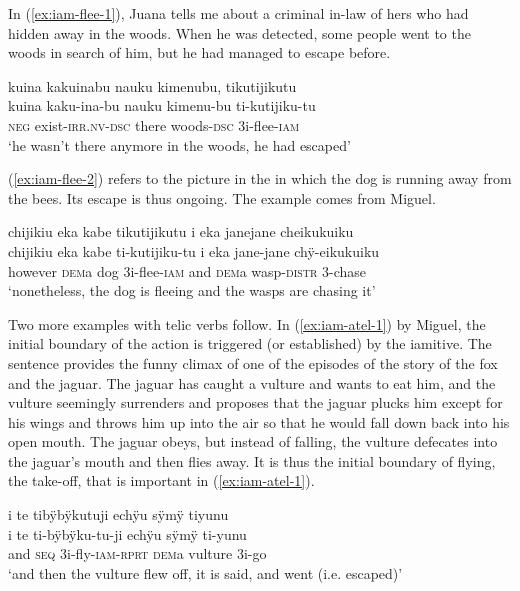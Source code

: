 In (\ref{ex:iam-flee-1}), Juana tells me about a criminal in-law of hers who had hidden away in the woods. When he was detected, some people went to the woods in search of him, but he had managed to escape before.

\ea\label{ex:iam-flee-1}
\begingl
\glpreamble kuina kakuinabu nauku kimenubu, tikutijikutu\\
\gla kuina kaku-ina-bu nauku kimenu-bu ti-kutijiku-tu\\
\glb \textsc{neg} exist-\textsc{irr.nv}-\textsc{dsc} there woods-\textsc{dsc} 3i-flee-\textsc{iam}\\
\glft ‘he wasn’t there anymore in the woods, he had escaped’
\endgl
\trailingcitation{[jxx-p120430l-2.053]}
\xe

(\ref{ex:iam-flee-2}) refers to the picture in the  in which the dog is running away from the bees. Its escape is thus ongoing. The example comes from Miguel.

\ea\label{ex:iam-flee-2}
\begingl
\glpreamble chijikiu eka kabe tikutijikutu i eka janejane cheikukuiku\\
\gla chijikiu eka kabe ti-kutijiku-tu i eka jane-jane chÿ-eikukuiku\\
\glb however \textsc{dem}a dog 3i-flee-\textsc{iam} and \textsc{dem}a wasp-\textsc{distr} 3-chase\\
\glft ‘nonetheless, the dog is fleeing and the wasps are chasing it’
\endgl
\trailingcitation{[mox-a110920l-2.104]}
\xe

Two more examples with telic verbs follow. In (\ref{ex:iam-atel-1}) by Miguel, the initial boundary of the action is triggered (or established) by the iamitive. The sentence provides the funny climax of one of the episodes of the story of the fox and the jaguar. The jaguar has caught a vulture and wants to eat him, and the vulture seemingly surrenders and proposes that the jaguar plucks him except for his wings and throws him up into the air so that he would fall down back into his open mouth. The jaguar obeys, but instead of falling, the vulture defecates into the jaguar’s mouth and then flies away. It is thus the initial boundary of flying, the take-off, that is important in (\ref{ex:iam-atel-1}).

\ea\label{ex:iam-atel-1}
\begingl
\glpreamble i te tibÿbÿkutuji echÿu sÿmÿ tiyunu\\
\gla i te ti-bÿbÿku-tu-ji echÿu sÿmÿ ti-yunu\\
\glb and \textsc{seq} 3i-fly-\textsc{iam}-\textsc{rprt} \textsc{dem}a vulture 3i-go\\
\glft ‘and then the vulture flew off, it is said, and went (i.e. escaped)’
\endgl
\trailingcitation{[jmx-n120429ls-x5.211]}
\xe


